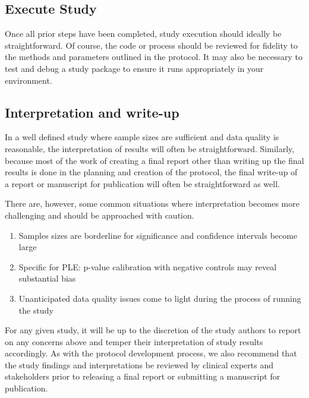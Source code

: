 \documentclass[11pt]{book}
\providecommand{\tightlist}{%
  \setlength{\itemsep}{0pt}\setlength{\parskip}{0pt}}
\theoremstyle{definition}
\theoremstyle{definition}
\theoremstyle{definition}
\theoremstyle{remark}
\begin{document}
\hypertarget{execute-study}{%
\subsection{Execute Study}\label{execute-study}}

Once all prior steps have been completed, study execution should ideally be straightforward. Of course, the code or process should be reviewed for fidelity to the methods and parameters outlined in the protocol. It may also be necessary to test and debug a study package to ensure it runs appropriately in your environment.

\hypertarget{interpretation-and-write-up}{%
\subsection{Interpretation and write-up}\label{interpretation-and-write-up}}

In a well defined study where sample sizes are sufficient and data quality is reasonable, the interpretation of results will often be straightforward. Similarly, because most of the work of creating a final report other than writing up the final results is done in the planning and creation of the protocol, the final write-up of a report or manuscript for publication will often be straightforward as well.

There are, however, some common situations where interpretation becomes more challenging and should be approached with caution.

\begin{enumerate}
\def\labelenumi{\arabic{enumi}.}
\tightlist
\item
  Samples sizes are borderline for significance and confidence intervals become large
\item
  Specific for PLE: p-value calibration with negative controls may reveal substantial bias
\item
  Unanticipated data quality issues come to light during the process of running the study
\end{enumerate}

For any given study, it will be up to the discretion of the study authors to report on any concerns above and temper their interpretation of study results accordingly.
As with the protocol development process, we also recommend that the study findings and interpretations be reviewed by clinical experts and stakeholders prior to releasing a final report or submitting a manuscript for publication.
\end{document}
